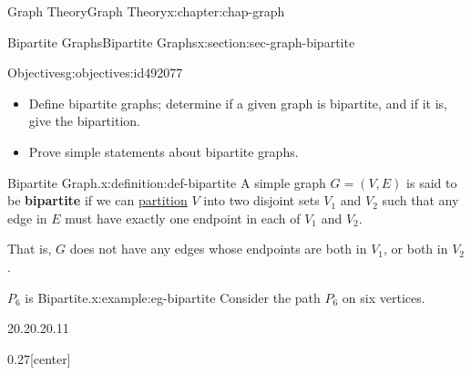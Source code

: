 \documentclass[oneside,10pt,]{book}
\newcommand{\terminology}[1]{\textbf{#1}}
\numberwithin{equation}{section}
\begin{document}
\begin{chapterptx}{Graph Theory}{}{Graph Theory}{}{}{x:chapter:chap-graph}
%
\begin{sectionptx}{Bipartite Graphs}{}{Bipartite Graphs}{}{}{x:section:sec-graph-bipartite}
\begin{objectives}{Objectives}{g:objectives:id492077}
%
\begin{itemize}[label=\textbullet]
\item{}Define bipartite graphs; determine if a given graph is bipartite, and if it is, give the bipartition.%
\item{}Prove simple statements about bipartite graphs.%
\end{itemize}
\end{objectives}
\begin{definition}{Bipartite Graph.}{x:definition:def-bipartite}%
A simple graph \(G = (V,E)\) is said to be \terminology{bipartite} if we can \hyperref[x:definition:def-partition]{partition} \(V\) into two disjoint sets \(V_1\) and \(V_2\) such that any edge in \(E\) must have exactly one endpoint in each of \(V_1\) and \(V_2\).%
\par
That is, \(G\) does not have any edges whose endpoints are both in \(V_1\), or both in \(V_2\).%
\end{definition}
\begin{example}{\(P_6\) is Bipartite.}{x:example:eg-bipartite}%
Consider the path \(P_6\) on six vertices.%
\begin{sidebyside}{2}{0.2}{0.2}{0.11}%
\begin{sbspanel}{0.27}[center]%
\end{sbspanel}
\end{sidebyside}
\end{example}
\end{sectionptx}
\end{chapterptx}
\end{document}
